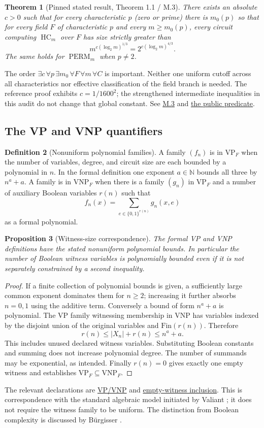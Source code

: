 \documentclass[11pt,letterpaper]{article}
\newtheorem{theorem}{Theorem}[section]
\newtheorem{proposition}[theorem]{Proposition}
\theoremstyle{definition}\newtheorem{definition}[theorem]{Definition}\newtheorem{example}[theorem]{Example}
\theoremstyle{remark}\newtheorem{remark}[theorem]{Remark}
\newcommand{\HC}{\operatorname{HC}}
\newcommand{\Perm}{\operatorname{PERM}}
\newcommand{\VP}{\mathrm{VP}}
\newcommand{\VNP}{\mathrm{VNP}}
\newcommand{\N}{\mathbb{N}}
\newcommand{\pub}[3]{\href{https://github.com/anthropics/formal-math/blob/11b6c7e3c927df2658f513b6b68ea7f8929c62c5/vp-vnp/#1\#L#2}{#3}}
\begin{document}
\begin{theorem}[Pinned stated result, Theorem 1.1 / M.3]\label{thm:main}
There exists an absolute $c>0$ such that for every characteristic $p$ (zero or prime) there is $m_0(p)$ so that for every field $F$ of characteristic $p$ and every $m\ge m_0(p)$, every circuit computing $\HC_m$ over $F$ has size strictly greater than
\[
 m^{c(\log_2 m)^{1/3}}=2^{c(\log_2m)^{4/3}}.
\]
The same holds for $\Perm_m$ when $p\ne2$.
\end{theorem}
The order $\exists c\,\forall p\,\exists m_0\,\forall F\,\forall m\,\forall C$ is important. Neither one uniform cutoff across all characteristics nor effective classification of the field branch is needed. The reference proof exhibits $c=1/1600^2$; the strengthened intermediate inequalities in this audit do not change that global constant. See \pub{Paper/Fields.lean}{80}{M.3} and \pub{Statement.lean}{41}{the public predicate}.

\subsection{The VP and VNP quantifiers}
\begin{definition}[Nonuniform polynomial families]
A family $(f_n)$ is in $\VP_F$ when the number of variables, degree, and circuit size are each bounded by a polynomial in $n$. In the formal definition one exponent $a\in\N$ bounds all three by $n^a+a$. A family is in $\VNP_F$ when there is a family $(g_n)$ in $\VP_F$ and a number of auxiliary Boolean variables $r(n)$ such that
\[
 f_n(x)=\sum_{e\in\{0,1\}^{r(n)}} g_n(x,e)
\]
as a formal polynomial.
\end{definition}
\begin{proposition}[Witness-size correspondence]\label{prop:witness}
The formal VP and VNP definitions have the stated nonuniform polynomial bounds. In particular the number of Boolean witness variables is polynomially bounded even if it is not separately constrained by a second inequality.
\end{proposition}
\begin{proof}
If a finite collection of polynomial bounds is given, a sufficiently large common exponent dominates them for $n\ge2$; increasing it further absorbs $n=0,1$ using the additive term. Conversely a bound of form $n^a+a$ is polynomial. The VP family witnessing membership in VNP has variables indexed by the disjoint union of the original variables and $\mathrm{Fin}(r(n))$. Therefore
\[
 r(n)\le |X_n|+r(n)\le n^a+a.
\]
This includes unused declared witness variables. Substituting Boolean constants and summing does not increase polynomial degree. The number of summands may be exponential, as intended. Finally $r(n)=0$ gives exactly one empty witness and establishes $\VP_F\subseteq\VNP_F$.
\end{proof}
The relevant declarations are \pub{Statement.lean}{75}{VP/VNP} and \pub{Paper/Rate.lean}{491}{empty-witness inclusion}. This is correspondence with the standard algebraic model initiated by Valiant \cite{valiant,bcs97,burgisser2000}; it does not require the witness family to be uniform. The distinction from Boolean complexity is discussed by B\"urgisser \cite{burgisserCook}.
\end{document}
